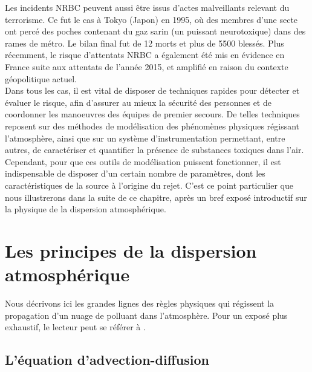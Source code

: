 	Les incidents NRBC peuvent aussi être issus d'actes malveillants relevant du terrorisme. Ce fut le cas à Tokyo (Japon) en 1995, où des membres d'une secte ont percé des poches contenant du gaz sarin (un puissant neurotoxique) dans des rames de métro. Le bilan final {fut}  de 12 morts et plus de 5500 blessés. Plus récemment, le risque d'attentats NRBC a également été mis en évidence  en France suite aux attentats de l'année 2015, et amplifié en raison du contexte géopolitique actuel.\\
	
	Dans tous les cas, il est vital de disposer de techniques rapides pour détecter et évaluer le risque, afin d'assurer au mieux la sécurité des personnes et de coordonner les manoeuvres des équipes de premier secours. De telles techniques reposent sur des méthodes de modélisation des phénomènes physiques régissant l'atmosphère, ainsi que sur un système d'instrumentation permettant, entre autres, de caractériser et quantifier la présence de substances toxiques dans l'air.\\
	
	Cependant, pour que ces outils de modélisation puissent fonctionner, il est indispensable de disposer d'un certain nombre de paramètres, dont les caractéristiques de la source à l'origine du rejet. C'est ce point particulier que nous illustrerons dans la suite de ce chapitre, après un bref exposé introductif sur la physique de la dispersion atmosphérique.\\
	
	\clearpage

	\section{Les principes de la dispersion atmosphérique}
	
	Nous décrivons ici les grandes lignes des règles physiques qui régissent la propagation d'un nuage de polluant dans l'atmosphère. Pour un exposé plus exhaustif, le lecteur peut se référer à \cite{Sportisse2008}.
	
	\subsection{L'équation d'advection-diffusion}
	
